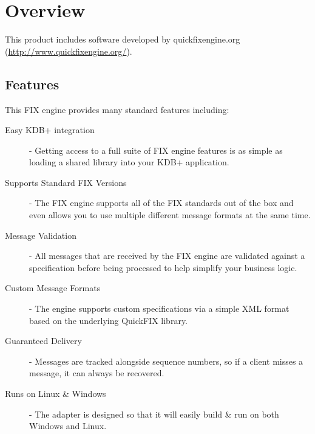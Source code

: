 \chapter{Overview}

This product includes software developed by quickfixengine.org (\url{http://www.quickfixengine.org/}).

\section{Features}

This FIX engine provides many standard features including:

\begin{description}
	\item[Easy KDB+ integration] - Getting access to a full suite of FIX engine features is as simple as loading a shared library into your KDB+ application.
	\item[Supports Standard FIX Versions] - The FIX engine supports all of the FIX standards out of the box and even allows you to use multiple different message formats at the same time.
	\item[Message Validation] - All messages that are received by the FIX engine are validated against a specification before being processed to help simplify your business logic.
	\item[Custom Message Formats] - The engine supports custom specifications via a simple XML format based on the underlying QuickFIX library.
	\item[Guaranteed Delivery] - Messages are tracked alongside sequence numbers, so if a client misses a message, it can always be recovered.
	\item[Runs on Linux \& Windows] - The adapter is designed so that it will easily build \& run on both Windows and Linux.
\end{description}
